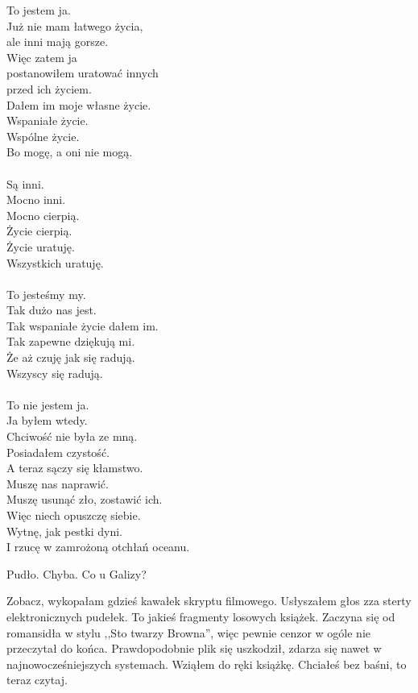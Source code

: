 \begin{poem}
	To jestem ja. \\
	Już nie mam łatwego życia, \\
	ale inni mają gorsze. \\
	Więc zatem ja \\
	postanowiłem uratować innych \\
	przed ich życiem. \\
	Dałem im moje własne życie. \\
	Wspaniałe życie. \\
	Wspólne życie. \\
	Bo mogę, a oni nie mogą. \\
	\\
	Są inni. \\
	Mocno inni. \\
	Mocno cierpią. \\
	Życie cierpią. \\
	Życie uratuję. \\
	Wszystkich uratuję. \\
	\\
	To jesteśmy my. \\
	Tak dużo nas jest. \\
	Tak wspaniałe życie dałem im. \\
	Tak zapewne dziękują mi. \\
	Że aż czuję jak się radują. \\
	Wszyscy się radują. \\
	\\
	To nie jestem ja. \\
	Ja byłem wtedy. \\
	Chciwość nie była ze mną. \\
	Posiadałem czystość. \\
	A teraz sączy się kłamstwo. \\
	Muszę nas naprawić. \\
	Muszę usunąć zło, zostawić ich. \\
	Więc niech opuszczę siebie. \\
	Wytnę, jak pestki dyni. \\
	I rzucę w zamrożoną otchłań oceanu.
\end{poem}

Pudło. Chyba. Co u Galizy?

\begin{dialogue}
	\ds{} Zobacz, wykopałam gdzieś kawałek skryptu filmowego. \dm{} Usłyszałem głos zza sterty elektronicznych pudełek. \dm{} To jakieś fragmenty losowych książek.
	Zaczyna się od romansidła w stylu ,,Sto twarzy Browna'', więc pewnie cenzor w ogóle nie przeczytał do końca.
	\ds{} Prawdopodobnie plik się uszkodził, zdarza się nawet w najnowocześniejszych systemach. \dm{} Wziąłem do ręki książkę.
	\ds{} Chciałeś bez baśni, to teraz czytaj.
\end{dialogue}

